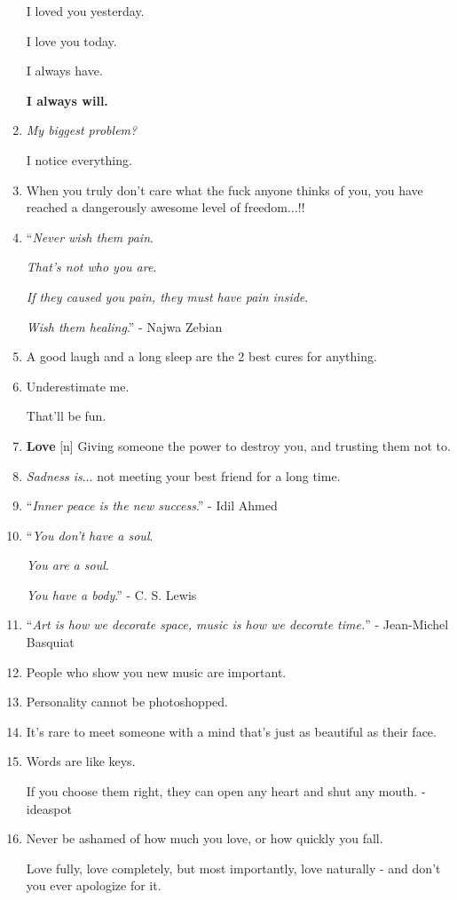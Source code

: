 \documentclass{article}
\begin{document}
\begin{enumerate}
	I loved you yesterday.
	
	I love you today.
	
	I always have.
	
	\textbf{I always will.}
	\item \textit{My biggest problem?}
	
	I notice everything.
	\item When you truly don't care what the fuck anyone thinks of you, you have reached a dangerously awesome level of freedom$\ldots$!!
	\item ``\textit{Never wish them pain}.
	
	\textit{That's not who you are}.
	
	\textit{If they caused you pain, they must have pain inside}.
	
	\textit{Wish them healing}.'' - Najwa Zebian
	\item A good laugh and a long sleep are the 2 best cures for anything.
	\item Underestimate me.
	
	That'll be fun.
	\item \textbf{Love} [n] Giving someone the power to destroy you, and trusting them not to.
	\item \textit{Sadness is}$\ldots$ not meeting your best friend for a long time.
	\item ``\textit{Inner peace is the new success}.'' - Idil Ahmed
	\item ``\textit{You don't have a soul}.
	
	\textit{You are a soul}.
	
	\textit{You have a body}.'' - C. S. Lewis
	\item ``\textit{Art is how we decorate space, music is how we decorate time.}'' - Jean-Michel Basquiat
	\item People who show you new music are important.
	\item Personality cannot be photoshopped.
	\item It's rare to meet someone with a mind that's just as beautiful as their face.
	\item Words are like keys.
	
	If you choose them right, they can open any heart and shut any mouth. - ideaspot
	\item Never be ashamed of how much you love, or how quickly you fall.
	
	Love fully, love completely, but most importantly, love naturally - and don't you ever apologize for it.
	

\end{enumerate}
\end{document}
